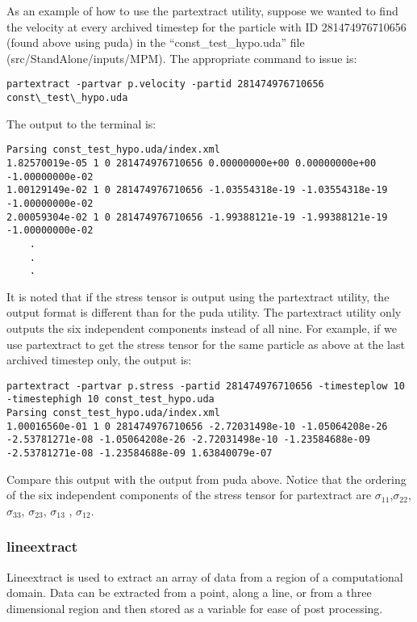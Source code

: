 As an example of how to use the partextract utility, suppose we wanted to find the velocity at every archived timestep for the particle with ID 281474976710656 (found above using puda) in the ``const\_test\_hypo.uda'' file (src/StandAlone/inputs/MPM).  The appropriate command to issue is:

\begin{Verbatim}[fontsize=\footnotesize]
partextract -partvar p.velocity -partid 281474976710656 const\_test\_hypo.uda
\end{Verbatim}

The output to the terminal is:

\begin{Verbatim}[fontsize=\footnotesize]
Parsing const_test_hypo.uda/index.xml
1.82570019e-05 1 0 281474976710656 0.00000000e+00 0.00000000e+00 -1.00000000e-02
1.00129149e-02 1 0 281474976710656 -1.03554318e-19 -1.03554318e-19 -1.00000000e-02
2.00059304e-02 1 0 281474976710656 -1.99388121e-19 -1.99388121e-19 -1.00000000e-02
	.
	.
	.
\end{Verbatim}

It is noted that if the stress tensor is output using the partextract utility, the output format is different than for the puda utility.  The partextract utility only outputs the six independent components instead of all nine.  For example, if we use partextract to get the stress tensor for the same particle as above at the last archived timestep only, the output is:

\begin{Verbatim}[fontsize=\footnotesize]
partextract -partvar p.stress -partid 281474976710656 -timesteplow 10 -timestephigh 10 const_test_hypo.uda
Parsing const_test_hypo.uda/index.xml
1.00016560e-01 1 0 281474976710656 -2.72031498e-10 -1.05064208e-26 -2.53781271e-08 -1.05064208e-26 -2.72031498e-10 -1.23584688e-09 -2.53781271e-08 -1.23584688e-09 1.63840079e-07
\end{Verbatim}

Compare this output with the output from puda above.  Notice that the ordering of the six independent components of the stress tensor for partextract are $\sigma_{11}$,$\sigma_{22}$, $\sigma_{33}$, $\sigma_{23}$, $\sigma_{13}$ , $\sigma_{12}$.

\subsubsection{lineextract}

Lineextract is used to extract an array of data from a region of a computational domain. Data can be extracted from a point, along a line, or from a three dimensional region and then stored as a variable for ease of post processing.

